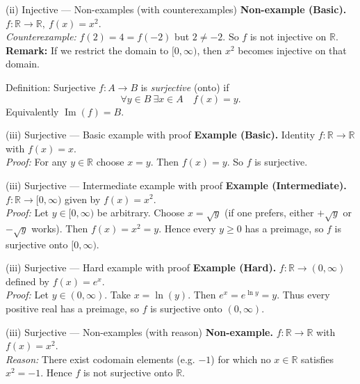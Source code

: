 \documentclass[11pt]{beamer}
\theoremstyle{plain}
\begin{document}
\begin{frame}{(ii) Injective — Non-examples (with counterexamples)}
  \textbf{Non-example (Basic).} \(f\colon\mathbb{R}\to\mathbb{R},\ f(x)=x^2\).\\
  \pause
  \emph{Counterexample:} \(f(2)=4=f(-2)\) but \(2\ne -2\). So \(f\) is not injective on \(\mathbb{R}\).\\[6pt]
  \textbf{Remark:} If we restrict the domain to \([0,\infty)\), then \(x^2\) becomes injective on that domain.
\end{frame}

\begin{frame}{Definition: Surjective}
  \(f\colon A\to B\) is \emph{surjective} (onto) if
  \[
    \forall y\in B\ \exists x\in A\quad f(x)=y.
  \]
  Equivalently \(\operatorname{Im}(f)=B\).
\end{frame}

\begin{frame}{(iii) Surjective — Basic example with proof}
  \textbf{Example (Basic).} Identity \(f\colon\mathbb{R}\to\mathbb{R}\) with \(f(x)=x\).\\[6pt]
  \pause
  \emph{Proof:} For any \(y\in\mathbb{R}\) choose \(x=y\). Then \(f(x)=y\). So \(f\) is surjective.
\end{frame}

\begin{frame}{(iii) Surjective — Intermediate example with proof}
  \textbf{Example (Intermediate).} \(f\colon\mathbb{R}\to[0,\infty)\) given by \(f(x)=x^2\).\\[6pt]
  \pause
  \emph{Proof:} Let \(y\in[0,\infty)\) be arbitrary. Choose \(x=\sqrt{y}\) (if one prefers, either \(+\sqrt{y}\) or \(-\sqrt{y}\) works). Then \(f(x)=x^2=y\). Hence every \(y\ge 0\) has a preimage, so \(f\) is surjective onto \([0,\infty)\).
\end{frame}

\begin{frame}{(iii) Surjective — Hard example with proof}
  \textbf{Example (Hard).} \(f\colon\mathbb{R}\to(0,\infty)\) defined by \(f(x)=e^x\).\\[6pt]
  \pause
  \emph{Proof:} Let \(y\in(0,\infty)\). Take \(x=\ln(y)\). Then \(e^x=e^{\ln y}=y\). Thus every positive real has a preimage, so \(f\) is surjective onto \((0,\infty)\).
\end{frame}

\begin{frame}{(iii) Surjective — Non-examples (with reason)}
  \textbf{Non-example.} \(f\colon\mathbb{R}\to\mathbb{R}\) with \(f(x)=x^2\).\\[6pt]
  \pause
  \emph{Reason:} There exist codomain elements (e.g. \(-1\)) for which no \(x\in\mathbb{R}\) satisfies \(x^2=-1\). Hence \(f\) is not surjective onto \(\mathbb{R}\).
\end{frame}
\end{document}
